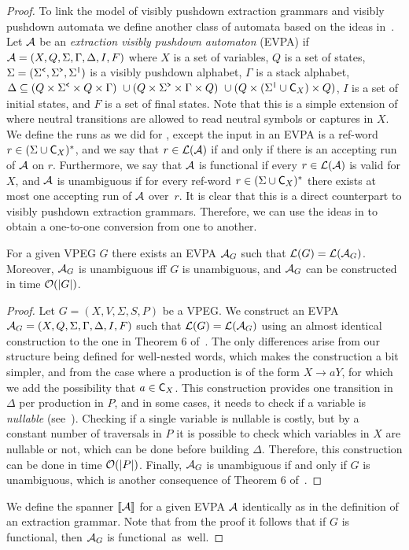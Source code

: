 
\begin{proof}
	
	To link the model of visibly pushdown extraction grammars and visibly pushdown automata we define another class of automata based on the ideas in~\cite{liatpaper}. Let $\mathcal{A}$ be an {\em extraction visibly pushdown automaton} (EVPA) if $\mathcal{A} = (X,Q,\Sigma,\Gamma,\Delta,I,F)$ where $X$ is a set of variables, $Q$ is a set of states, $\Sigma = (\Sigma^{\texttt{<}},\Sigma^{\texttt{>}},\Sigma^{\texttt{|}})$ is a visibly pushdown alphabet, $\Gamma$ is a stack alphabet, $\Delta \subseteq
	(Q \times \Sigma^{\texttt{<}} \times Q \times \Gamma) \ \cup (Q \times \Sigma^{\texttt{>}} \times \Gamma \times Q) \ \cup (Q \times (\Sigma^{\texttt{|}}\cup\textsf{C}_{X}) \times Q)$, $I$ is a set of initial states, and $F$ is a set of final states. Note that this is a simple extension of \vpa where neutral transitions are allowed to read neutral symbols or captures in $X$. 
	We define the runs as we did for \vpa, except the input in an EVPA is a ref-word $r\in(\Sigma\cup\textsf{C}_{X})^*$, and we say that $r\in\mathcal{L}(\mathcal{A})$ if and only if there is an accepting run of $\mathcal{A}$ on $r$. Furthermore, we say that $\mathcal{A}$ is functional if every $r\in\mathcal{L}(\mathcal{A})$ is valid for $X$, and $\mathcal{A}$ is unambiguous if for every ref-word $r\in (\Sigma\cup\textsf{C}_{X})^*$ there exists at most one accepting run of $\mathcal{A}$ over~$r$. It is clear that this is a direct counterpart to visibly pushdown extraction grammars. Therefore, we can use the ideas in \cite{AlurM04} to obtain a one-to-one conversion from one to another.
	
	\begin{claim}\label{nested:appendix:spannerclaim}
		For a given VPEG $G$ there exists an EVPA $\mathcal{A}_G$ such that $\mathcal{L}(G) = \mathcal{L}(\mathcal{A}_G)$. Moreover, $\mathcal{A}_G$ is unambiguous iff $G$ is unambiguous, and $\mathcal{A}_G$ can be constructed in time $\mathcal{O}(\vert G\vert)$.
	\end{claim}
	\begin{proof}
		Let $G = (X, V, \Sigma, S, P)$ be a VPEG. We construct an EVPA $\mathcal{A}_G = (X,Q,\Sigma,\Gamma,\Delta,I,F)$ such that $\mathcal{L}(G) = \mathcal{L}(\mathcal{A}_G)$ using an almost identical construction to the one in Theorem 6 of~\cite{AlurM04}. The only differences arise from our structure being defined for well-nested words, which makes the construction a bit simpler, and from the case where a production is of the form $X\to aY$, for which we add the possibility that $a\in\textsf{C}_{X}$. This construction provides one transition in $\Delta$ per production in $P$, and in some cases, it needs to check if a variable is {\it nullable} (see~\cite{AlurM04}). Checking if a single variable is nullable is costly, but by a constant number of traversals in $P$ it is possible to check which variables in $X$ are nullable or not, which can be done before building $\Delta$. Therefore, this construction can be done in time $\mathcal{O}(\vert P\vert)$. Finally, $\mathcal{A}_G$ is unambiguous if and only if $G$ is unambiguous, which is another consequence of Theorem 6 of~\cite{AlurM04}.	
	\end{proof}
	We define the spanner $\llbracket \mathcal{A} \rrbracket$ for a given EVPA $\mathcal{A}$ identically as in the definition of an extraction grammar. Note that from the proof it follows that if $G$ is functional, then $\mathcal{A}_G$ is functional~as~well.
	

\end{proof}
